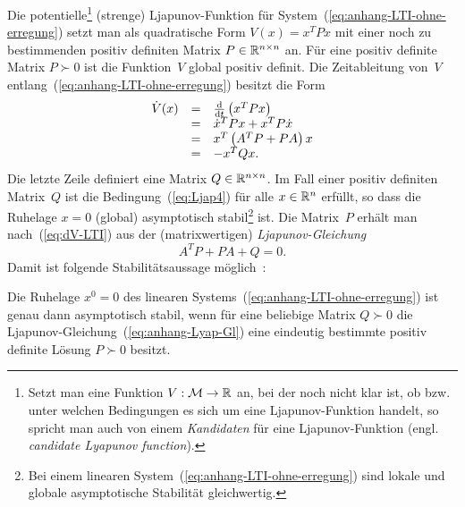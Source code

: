 Die potentielle\footnote{Setzt man eine Funktion $V:\mathcal{M}\to{\mathbb{R}}$ an, bei der noch nicht
klar ist, ob bzw. unter welchen Bedingungen es sich um eine Ljapunov-Funktion
handelt, so spricht man auch von einem \emph{Kandidaten} für eine
Ljapunov-Funktion (engl. \emph{candidate Lyapunov function}).} (strenge) Ljapunov-Funktion für System~(\ref{eq:anhang-LTI-ohne-erregung})
setzt man als quadratische Form $V(x)=x^{T}Px$ mit einer noch zu
bestimmenden positiv definiten Matrix $P\in{\mathbb{R}}^{n\times n}$ an. Für
eine positiv definite Matrix $P\succ0$ ist die Funktion~$V$ global
positiv definit. Die Zeitableitung von~$V$ entlang~(\ref{eq:anhang-LTI-ohne-erregung})
besitzt die Form
\begin{equation}
\begin{array}{ccl}
\dot{V}(x) & = & \frac{{\mathrm{d}}}{{\mathrm{d}} t}\left(x^{T}Px\right)\\
 & = & \dot{x}^{T}Px+x^{T}P\dot{x}\\
 & = & x^{T}\left(A^{T}P+PA\right)x\\
 & = & -x^{T}Qx.
\end{array}\label{eq:dV-LTI}
\end{equation}
Die letzte Zeile definiert eine Matrix $Q\in{\mathbb{R}}^{n\times n}$. Im Fall
einer positiv definiten Matrix~$Q$ ist die Bedingung~(\ref{eq:Ljap4})
für alle $x\in{\mathbb{R}}^{n}$ erfüllt, so dass die Ruhelage $x=0$ (global)
asymptotisch stabil\footnote{Bei einem linearen System~(\ref{eq:anhang-LTI-ohne-erregung}) sind
lokale und globale asymptotische Stabilität gleichwertig.} ist. Die Matrix~$P$ erhält man nach~(\ref{eq:dV-LTI}) aus der
(matrixwertigen) \emph{Ljapunov-Gleichung}
\begin{equation}
A^{T}P+PA+Q=0.\label{eq:anhang-Lyap-Gl}
\end{equation}
Damit ist folgende Stabilitätsaussage möglich~\cite[Abschnitt~{16.5}]{gantmacher86}:
\begin{theorem}
\label{thm:Lyapunov-Stabilitaet-LTI}Die Ruhelage $x^{0}=0$ des linearen
Systems~(\ref{eq:anhang-LTI-ohne-erregung}) ist genau dann asymptotisch
stabil, wenn für eine beliebige Matrix $Q\succ0$ die Ljapunov-Gleichung~(\ref{eq:anhang-Lyap-Gl})
eine eindeutig bestimmte positiv definite Lösung $P\succ0$ besitzt. 
\end{theorem}

